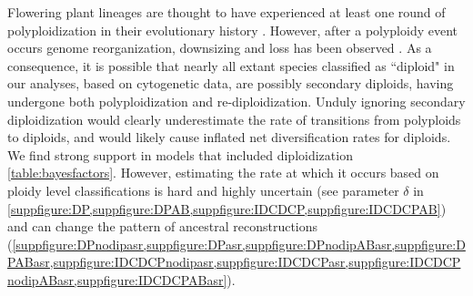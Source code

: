 
Flowering plant lineages are thought to have experienced at least one round of polyploidization in their evolutionary history \citep{soltis_2015}. However, after a polyploidy event occurs genome reorganization, downsizing and loss has been observed \citep{dodsworth_2015, zenil_2016, mandakova_2018}. As a consequence, it is possible that nearly all extant species classified as ``diploid" in our analyses, based on cytogenetic data, are possibly secondary diploids, having undergone both polyploidization and re-diploidization.
Unduly ignoring secondary diploidization would clearly underestimate the rate of transitions from polyploids to diploids, and would likely cause inflated net diversification rates for diploids. %
We find strong support in models that included diploidization \cref{table:bayesfactors}. However, estimating the rate at which it occurs based on ploidy level classifications is hard and highly uncertain (see parameter $\delta$ in \cref{suppfigure:DP,suppfigure:DPAB,suppfigure:IDCDCP,suppfigure:IDCDCPAB}) and can change the pattern of ancestral reconstructions (\cref{suppfigure:DPnodipasr,suppfigure:DPasr,suppfigure:DPnodipABasr,suppfigure:DPABasr,suppfigure:IDCDCPnodipasr,suppfigure:IDCDCPasr,suppfigure:IDCDCPnodipABasr,suppfigure:IDCDCPABasr}).

